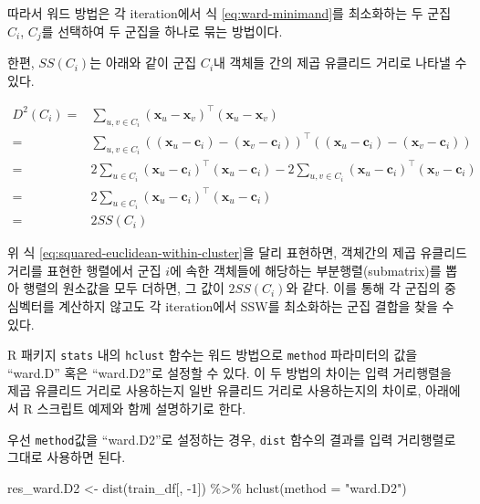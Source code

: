 \documentclass[
]{book}
\newenvironment{Shaded}{\begin{snugshade}}{\end{snugshade}}
\newcommand{\AttributeTok}[1]{\textcolor[rgb]{0.77,0.63,0.00}{#1}}
\newcommand{\DecValTok}[1]{\textcolor[rgb]{0.00,0.00,0.81}{#1}}
\newcommand{\FunctionTok}[1]{\textcolor[rgb]{0.00,0.00,0.00}{#1}}
\newcommand{\NormalTok}[1]{#1}
\newcommand{\OtherTok}[1]{\textcolor[rgb]{0.56,0.35,0.01}{#1}}
\newcommand{\SpecialCharTok}[1]{\textcolor[rgb]{0.00,0.00,0.00}{#1}}
\newcommand{\StringTok}[1]{\textcolor[rgb]{0.31,0.60,0.02}{#1}}
\begin{document}
따라서 워드 방법은 각 iteration에서 식 \eqref{eq:ward-minimand}를 최소화하는 두 군집 \(C_i\), \(C_j\)를 선택하여 두 군집을 하나로 묶는 방법이다.

한편, \(SS(C_i)\)는 아래와 같이 군집 \(C_i\)내 객체들 간의 제곱 유클리드 거리로 나타낼 수 있다.

\begin{equation}
\begin{split}
D^2(C_i) =& \sum_{u, v \in C_i} (\mathbf{x}_u - \mathbf{x}_v)^\top (\mathbf{x}_u - \mathbf{x}_v)\\
=& \sum_{u, v \in C_i} \left((\mathbf{x}_u - \mathbf{c}_i) - (\mathbf{x}_v - \mathbf{c}_i)\right)^\top \left((\mathbf{x}_u - \mathbf{c}_i) - (\mathbf{x}_v - \mathbf{c}_i)\right)\\
=& 2 \sum_{u \in C_i} (\mathbf{x}_u - \mathbf{c}_i)^\top (\mathbf{x}_u - \mathbf{c}_i) - 2 \sum_{u, v \in C_i} (\mathbf{x}_u - \mathbf{c}_i)^\top (\mathbf{x}_v - \mathbf{c}_i)\\
=& 2 \sum_{u \in C_i} (\mathbf{x}_u - \mathbf{c}_i)^\top (\mathbf{x}_u - \mathbf{c}_i)\\
=& 2 SS(C_i)
\end{split}
\label{eq:squared-euclidean-within-cluster}
\end{equation}

위 식 \eqref{eq:squared-euclidean-within-cluster}을 달리 표현하면, 객체간의 제곱 유클리드 거리를 표현한 행렬에서 군집 \(i\)에 속한 객체들에 해당하는 부분행렬(submatrix)를 뽑아 행렬의 원소값을 모두 더하면, 그 값이 \(2 SS(C_i)\)와 같다. 이를 통해 각 군집의 중심벡터를 계산하지 않고도 각 iteration에서 SSW를 최소화하는 군집 결합을 찾을 수 있다.

R 패키지 \texttt{stats} 내의 \texttt{hclust} 함수는 워드 방법으로 \texttt{method} 파라미터의 값을 ``ward.D'' 혹은 ``ward.D2''로 설정할 수 있다. 이 두 방법의 차이는 입력 거리행렬을 제곱 유클리드 거리로 사용하는지 일반 유클리드 거리로 사용하는지의 차이로, 아래에서 R 스크립트 예제와 함께 설명하기로 한다.

우선 \texttt{method}값을 ``ward.D2''로 설정하는 경우, \texttt{dist} 함수의 결과를 입력 거리행렬로 그대로 사용하면 된다.

\begin{Shaded}
\begin{Highlighting}[]
\NormalTok{res\_ward.D2 }\OtherTok{\textless{}{-}} \FunctionTok{dist}\NormalTok{(train\_df[, }\SpecialCharTok{{-}}\DecValTok{1}\NormalTok{]) }\SpecialCharTok{\%\textgreater{}\%}
  \FunctionTok{hclust}\NormalTok{(}\AttributeTok{method =} \StringTok{"ward.D2"}\NormalTok{)}
\end{Highlighting}
\end{Shaded}
\end{document}
